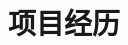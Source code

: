 \documentclass[letterpaper]{twentysecondcv} %
\begin{document}
\begin{twentyfluid}

\end{twentyfluid}

\vspace{-0.2cm}
\section{项目经历}
\end{document}
